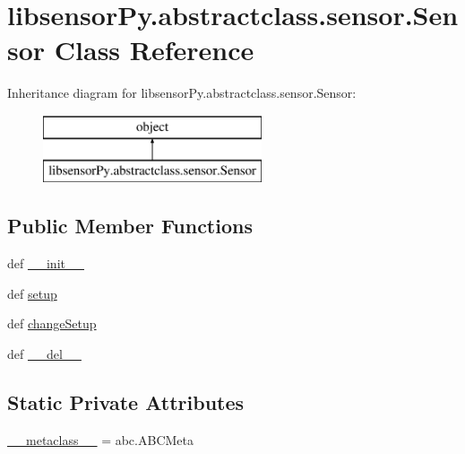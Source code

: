 \hypertarget{classlibsensorPy_1_1abstractclass_1_1sensor_1_1Sensor}{}\section{libsensor\+Py.\+abstractclass.\+sensor.\+Sensor Class Reference}
\label{classlibsensorPy_1_1abstractclass_1_1sensor_1_1Sensor}
Inheritance diagram for libsensor\+Py.\+abstractclass.\+sensor.\+Sensor\+:\begin{figure}[H]
\begin{center}
\leavevmode
\includegraphics[height=2.000000cm]{classlibsensorPy_1_1abstractclass_1_1sensor_1_1Sensor}
\end{center}
\end{figure}
\subsection*{Public Member Functions}
\begin{DoxyCompactItemize}
\item 
def \hyperlink{classlibsensorPy_1_1abstractclass_1_1sensor_1_1Sensor_a83158bd0c1fba292bfad761d17f59199}{\+\_\+\+\_\+init\+\_\+\+\_\+}
\item 
def \hyperlink{classlibsensorPy_1_1abstractclass_1_1sensor_1_1Sensor_aa4a15331f29a4ed47b7b7bb0b1988c1a}{setup}
\item 
def \hyperlink{classlibsensorPy_1_1abstractclass_1_1sensor_1_1Sensor_a167f2e15ce84a9b2470330296fb6bb85}{change\+Setup}
\item 
def \hyperlink{classlibsensorPy_1_1abstractclass_1_1sensor_1_1Sensor_a8fa4ca3f1ef09c1c2802f6920056f7c5}{\+\_\+\+\_\+del\+\_\+\+\_\+}
\end{DoxyCompactItemize}
\subsection*{Static Private Attributes}
\begin{DoxyCompactItemize}
\item 
\hyperlink{classlibsensorPy_1_1abstractclass_1_1sensor_1_1Sensor_a26b6e84d38a6408de3330123fca91335}{\+\_\+\+\_\+metaclass\+\_\+\+\_\+} = abc.\+A\+B\+C\+Meta
\end{DoxyCompactItemize}


